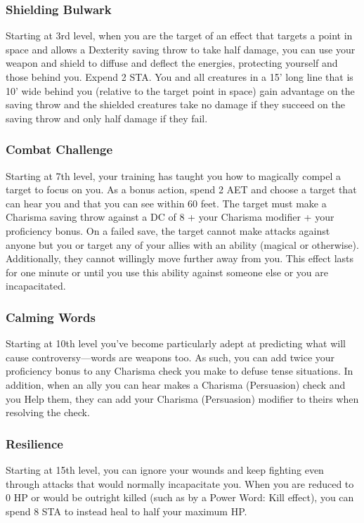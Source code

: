 \subsubsection{Shielding Bulwark}
Starting at 3rd level, when you are the target of an effect that targets a point in space and allows a Dexterity saving throw to take half damage, you can use your weapon and shield to diffuse and deflect the energies, protecting yourself and those behind you. Expend 2 STA. You and all creatures in a 15' long line that is 10' wide behind you (relative to the target point in space) gain advantage on the saving throw and the shielded creatures take no damage if they succeed on the saving throw and only half damage if they fail.

\subsubsection{Combat Challenge}
Starting at 7th level, your training has taught you how to magically compel a target to focus on you. As a bonus action, spend 2 AET and choose a target that can hear you and that you can see within 60 feet. The target must make a Charisma saving throw against a DC of 8 + your Charisma modifier + your proficiency bonus. On a failed save, the target cannot make attacks against anyone but you or target any of your allies with an ability (magical or otherwise). Additionally, they cannot willingly move further away from you. This effect lasts for one minute or until you use this ability against someone else or you are incapacitated.

\subsubsection{Calming Words}
Starting at 10th level you've become particularly adept at predicting what will cause controversy---words are weapons too. As such, you can add twice your proficiency bonus to any Charisma check you make to defuse tense situations. In addition, when an ally you can hear makes a Charisma (Persuasion) check and you Help them, they can add your Charisma (Persuasion) modifier to theirs when resolving the check.

\subsubsection{Resilience}
Starting at 15th level, you can ignore your wounds and keep fighting even through attacks that would normally incapacitate you. When you are reduced to 0 HP or would be outright killed (such as by a Power Word: Kill effect), you can spend 8 STA to instead heal to half your maximum HP.

